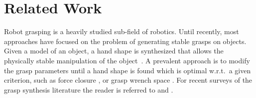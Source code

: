 \documentclass[a4paper,10pt,twocolumn]{article}
\begin{document}
%	
%	

\section{Related Work}
Robot grasping is a heavily studied sub-field of robotics.
Until recently, most approaches have focused on the problem 
of generating stable grasps on objects. Given a model of an object, a hand shape is synthesized 
that allows the physically stable manipulation of the object~\cite{Klank2009, Kragic2001}.
A prevalent approach is to modify the grasp parameters 
until a hand shape is found which is optimal w.r.t.~a given criterion, such as force closure \cite{nguyen}, or grasp wrench space \cite{Borst}. For recent surveys 
of the grasp synthesis literature the reader is referred to \cite{Bohg2014} and \cite{Sahbani2012}.
\end{document}
